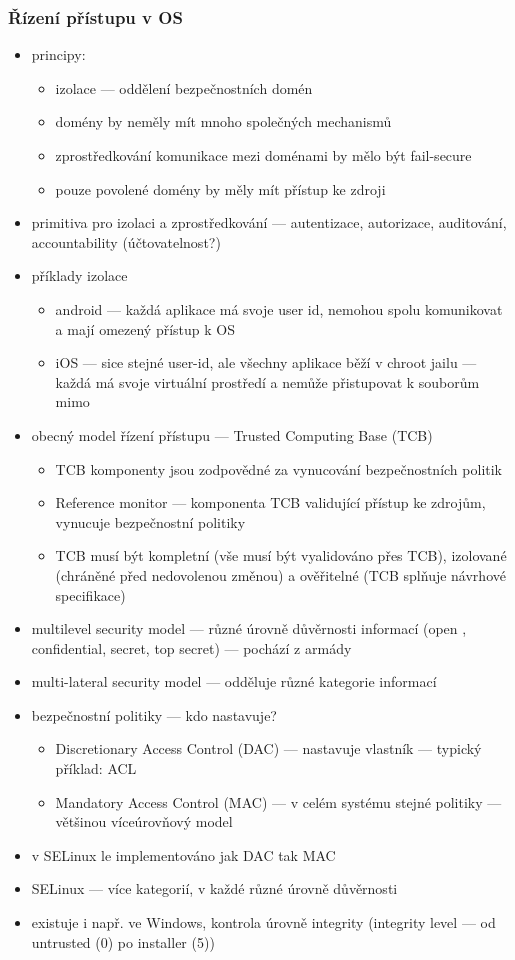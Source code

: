 \subsubsection*{Řízení přístupu v OS}
\begin{itemize}
	\item principy:
	\begin{itemize}
		\item izolace --- oddělení bezpečnostních domén
		\item domény by neměly mít mnoho společných mechanismů
		\item zprostředkování komunikace mezi doménami by mělo být fail-secure
		\item pouze povolené domény by měly mít přístup ke zdroji
	\end{itemize}
	\item primitiva pro izolaci a zprostředkování --- autentizace, autorizace, auditování, accountability (úč\-to\-va\-tel\-nost?)
	\item příklady izolace
	\begin{itemize}
		\item android --- každá aplikace má svoje user id, nemohou spolu komunikovat a mají omezený přístup k OS
		\item iOS --- sice stejné user-id, ale všechny aplikace běží v chroot jailu --- každá má svoje virtuální prostředí a nemůže přistupovat k souborům mimo
	\end{itemize}
	\item obecný model řízení přístupu --- Trusted Computing Base (TCB)
	\begin{itemize}
		\item TCB komponenty jsou zodpovědné za vynucování bezpečnostních politik
		\item Reference monitor --- komponenta TCB validující přístup ke zdrojům, vynucuje bezpečnostní politiky
		\item TCB musí být kompletní (vše musí být vyalidováno přes TCB), izolované (chráněné před nedovolenou změnou) a ověřitelné (TCB splňuje návrhové specifikace)
	\end{itemize}
	\item multilevel security model --- různé úrovně důvěrnosti informací (open , confidential, secret, top secret) --- pochází z armády
	\item multi-lateral security model --- odděluje různé kategorie informací
	\item bezpečnostní politiky --- kdo nastavuje?
	\begin{itemize}
		\item Discretionary Access Control (DAC) --- nastavuje vlastník  --- typický příklad: ACL
		\item Mandatory Access Control (MAC) --- v celém systému stejné politiky --- většinou víceúrovňový model
	\end{itemize}
	\item v SELinux le implementováno jak DAC tak MAC
	\item SELinux --- více kategorií, v každé různé úrovně důvěrnosti
	\item existuje i např. ve Windows, kontrola úrovně integrity (integrity level --- od untrusted (0) po installer (5))
\end{itemize}